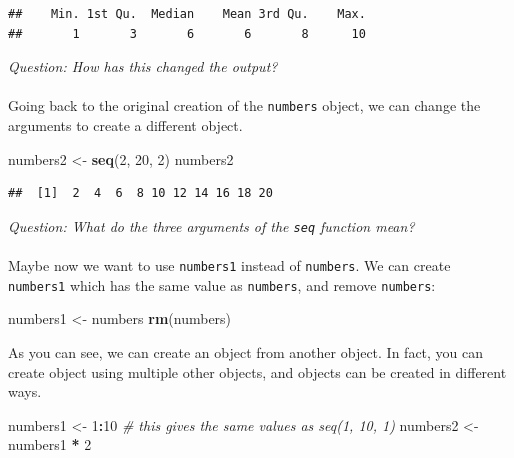 \documentclass[
]{book}
\newenvironment{Shaded}{\begin{snugshade}}{\end{snugshade}}
\newcommand{\CommentTok}[1]{\textcolor[rgb]{0.56,0.35,0.01}{\textit{#1}}}
\newcommand{\DecValTok}[1]{\textcolor[rgb]{0.00,0.00,0.81}{#1}}
\newcommand{\KeywordTok}[1]{\textcolor[rgb]{0.13,0.29,0.53}{\textbf{#1}}}
\newcommand{\NormalTok}[1]{#1}
\newcommand{\OperatorTok}[1]{\textcolor[rgb]{0.81,0.36,0.00}{\textbf{#1}}}
\newcommand{\StringTok}[1]{\textcolor[rgb]{0.31,0.60,0.02}{#1}}
\begin{document}
\begin{verbatim}
##    Min. 1st Qu.  Median    Mean 3rd Qu.    Max. 
##       1       3       6       6       8      10
\end{verbatim}

\emph{Question: How has this changed the output?}\\
~\\

Going back to the original creation of the \texttt{numbers} object, we can change the
arguments to create a different object.

\begin{Shaded}
\begin{Highlighting}[]
\NormalTok{numbers2 <-}\StringTok{ }\KeywordTok{seq}\NormalTok{(}\DecValTok{2}\NormalTok{, }\DecValTok{20}\NormalTok{, }\DecValTok{2}\NormalTok{)}
\NormalTok{numbers2}
\end{Highlighting}
\end{Shaded}

\begin{verbatim}
##  [1]  2  4  6  8 10 12 14 16 18 20
\end{verbatim}

\emph{Question: What do the three arguments of the \texttt{seq} function mean?}\\
~\\

Maybe now we want to use \texttt{numbers1} instead of \texttt{numbers}. We can create \texttt{numbers1}
which has the same value as \texttt{numbers}, and remove \texttt{numbers}:

\begin{Shaded}
\begin{Highlighting}[]
\NormalTok{numbers1 <-}\StringTok{ }\NormalTok{numbers}
\KeywordTok{rm}\NormalTok{(numbers)}
\end{Highlighting}
\end{Shaded}

As you can see, we can create an object from another object. In fact, you can
create object using multiple other objects, and objects can be created in
different ways.

\begin{Shaded}
\begin{Highlighting}[]
\NormalTok{numbers1 <-}\StringTok{ }\DecValTok{1}\OperatorTok{:}\DecValTok{10}  \CommentTok{# this gives the same values as seq(1, 10, 1)}
\NormalTok{numbers2 <-}\StringTok{ }\NormalTok{numbers1 }\OperatorTok{*}\StringTok{ }\DecValTok{2}
\end{Highlighting}
\end{Shaded}
\end{document}
